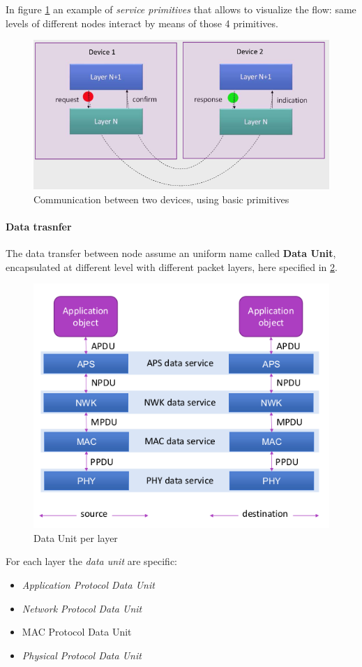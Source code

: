 \documentclass[10pt,a4paper]{report}
\theoremstyle{definition}
\begin{document}
In figure \ref{zigbee-com-example} an example of \textit{service primitives} that allows to visualize the flow: same levels of different nodes interact by means of those 4 primitives.
\begin{figure}[h]
	\centering\includegraphics[scale=0.40]{images/Pasted image 20230307163642.png}
	\caption{Communication between two devices, using basic primitives}
\label{zigbee-com-example}
\end{figure}

\paragraph{Data trasnfer}\label{sec:data-trasnfer}
The data transfer between node assume an uniform name called \textbf{Data Unit}, encapsulated at different level with different packet layers, here specified in \ref{data-unit-layer}.

\begin{figure}[h]
	\centering\includegraphics[scale=0.40]{images/Pasted image 20230307163743.png}
	\caption{Data Unit per layer}
	\label{data-unit-layer}
\end{figure}
For each layer the \textit{data unit} are specific:
\begin{itemize}
	\item 
	\textit{Application Protocol Data Unit}
	\item 
	\textit{Network Protocol Data Unit}
	\item 
	MAC Protocol Data Unit
	\item 
	\textit{Physical Protocol Data Unit}
\end{itemize}
\end{document}
